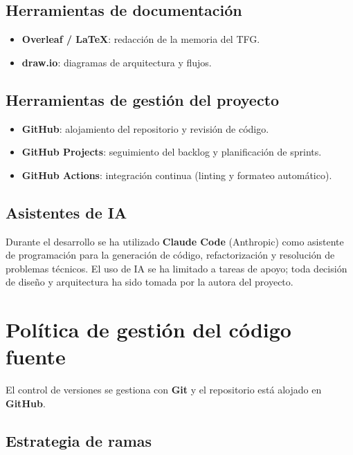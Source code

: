 \subsection{Herramientas de documentación}

\begin{itemize}
    \item \textbf{Overleaf / LaTeX}: redacción de la memoria del TFG.
    \item \textbf{draw.io}: diagramas de arquitectura y flujos.
\end{itemize}

\subsection{Herramientas de gestión del proyecto}

\begin{itemize}
    \item \textbf{GitHub}: alojamiento del repositorio y revisión de código.
    \item \textbf{GitHub Projects}: seguimiento del backlog y planificación de sprints.
    \item \textbf{GitHub Actions}: integración continua (linting y formateo automático).
\end{itemize}

\subsection{Asistentes de IA}

Durante el desarrollo se ha utilizado \textbf{Claude Code} (Anthropic) como asistente de programación para la generación de código, refactorización y resolución de problemas técnicos. El uso de IA se ha limitado a tareas de apoyo; toda decisión de diseño y arquitectura ha sido tomada por la autora del proyecto.

\section{Política de gestión del código fuente}

El control de versiones se gestiona con \textbf{Git} y el repositorio está alojado en \textbf{GitHub}.

\subsection{Estrategia de ramas}


